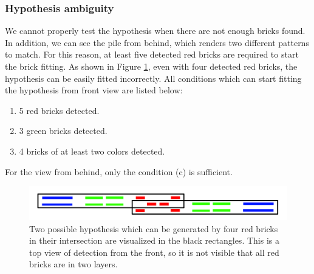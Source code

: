 \subsubsection{Hypothesis ambiguity}
We cannot properly test the hypothesis when there are not enough bricks found. In addition, we can see the pile from behind, which renders two different patterns to match. For this reason, at least five detected red bricks are required to start the brick fitting. As shown in Figure \ref{fig:ambiguity}, even with four detected red bricks, the hypothesis can be easily fitted incorrectly. All conditions which can start fitting the hypothesis from front view are listed below:
\begin{enumerate}[label=(\alph*)]
\item 5 red bricks detected.
\item 3 green bricks detected.
\item 4 bricks of at least two colors detected.
\end{enumerate}
For the view from behind, only the condition (c) is sufficient.
\begin{figure}[H]
\centering
\includegraphics[scale=0.3]{fig/ambiguous.png}
\caption[Hypothesis ambiguity]{Two possible hypothesis which can be generated by four red bricks in their intersection are visualized in the black rectangles. This is a top view of detection from the front, so it is not visible that all red bricks are in two layers.}
\label{fig:ambiguity}
\end{figure}

